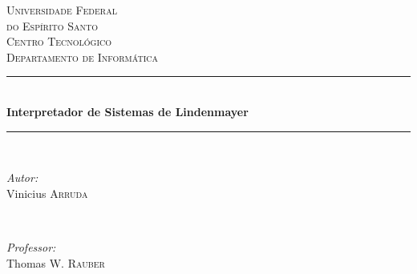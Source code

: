 \documentclass[a4paper,12pt]{article}%
\begin{document}



\begin{titlepage}

\newcommand{\HRule}{\rule{\linewidth}{0.5mm}} %

\center %
 

\textsc{\LARGE Universidade Federal\\do Espírito Santo}\\[1.5cm] %
\textsc{\Large Centro Tecnológico}\\[0.5cm] %
\textsc{\large Departamento de Informática}\\[0.5cm] %


\HRule \\[0.4cm]
{ \huge \bfseries Interpretador de Sistemas de Lindenmayer}\\[0.4cm] %
\HRule \\[1.5cm]


\begin{minipage}{0.4\textwidth}
\begin{flushleft} \large
\emph{Autor:}\\
Vinicius \textsc{Arruda} %
\end{flushleft}
\end{minipage}
~
\begin{minipage}{0.4\textwidth}
\begin{flushright} \large
\emph{Professor:} \\
Thomas W. \textsc{Rauber} %
\end{flushright}
\end{minipage}\\[2cm]


\end{titlepage}
\end{document}
